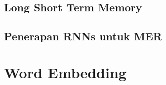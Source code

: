 \subsection{Long Short Term Memory}
\subsection{Penerapan RNNs untuk MER}

\section{Word Embedding}
